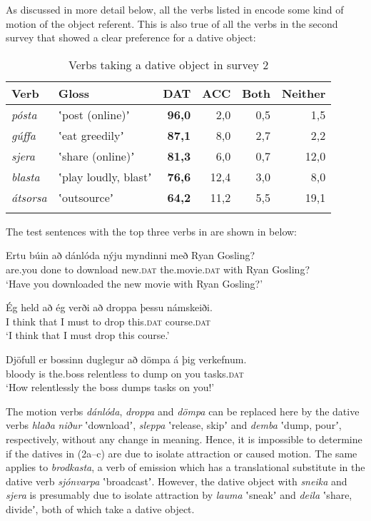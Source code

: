 \documentclass[output=paper,modfonts,nonflat,colorlinks,citecolor=brown]{langsci/langscibook}
\begin{document}
As discussed in more detail below, all the verbs listed in  encode some kind of motion of the object referent. This is also true of all the verbs in the second survey that showed a clear preference for a dative object:

\begin{table}
{\caption{\label{tab:jonsson:2}Verbs taking a dative object in survey 2}}
\begin{tabularx}{\textwidth}{XXrrrr}
\lsptoprule
Verb & Gloss & \textbf{DAT} & ACC & Both & Neither\\
\midrule
\textit{pósta} & ʽpost (online)ʼ & \textbf{96,0} & 2,0 & 0,5 & 1,5\\
\textit{gúffa} & ʽeat greedilyʼ & \textbf{87,1} & 8,0 & 2,7 & 2,2\\
\textit{sjera} & ʽshare (online)ʼ & \textbf{81,3} & 6,0 & 0,7 & 12,0\\
\textit{blasta} & ʽplay loudly, blastʼ & \textbf{76,6} & 12,4 & 3,0 & 8,0\\
\textit{átsorsa} & ʽoutsourceʼ & \textbf{64,2} & 11,2 & 5,5 & 19,1\\
\lspbottomrule
\end{tabularx}
\end{table}

The test sentences with the top three verbs in  are shown in  below:


\ea%
    \label{ex:jonsson:2}

\ea
\gll  Ertu  búin  að  dánlóda  nýju  myndinni  með  Ryan  Gosling?\\
   are.you  done  to  download  new.\textsc{dat}  the.movie.\textsc{dat}  with  Ryan  Gosling?\\
\glt `Have you downloaded the new movie with Ryan Gosling?'


\ex
\gll   Ég  held  að  ég  verði  að  droppa  þessu  námskeiði.\\
 I  think  that  I  must  to  drop  this.\textsc{dat}  course.\textsc{dat}\\
\glt `I think that I must drop this course.'


\ex
\gll   Djöfull  er  bossinn  duglegur  að  dömpa  á  þig  verkefnum.\\
 bloody  is  the.boss  relentless  to  dump  on  you  tasks.\textsc{dat}\\
\glt `How relentlessly the boss dumps tasks on you!'
\z
\z

The motion verbs \textit{dánlóda}, \textit{droppa} and \textit{dömpa} can be replaced here by the dative verbs \textit{hlaða} \textit{niður} ʽdownloadʼ, \textit{sleppa} ʽrelease, skipʼ and \textit{demba} ʽdump, pourʼ, respectively, without any change in meaning.\textstyleFootnoteSymbol{} Hence, it is impossible to determine if the datives in (2a--c) are due to isolate attraction or caused motion. The same applies to \textit{brodkasta}, a verb of emission which has a translational substitute in the dative verb \textit{sjónvarpa} ʽbroadcastʼ. However, the dative object with \textit{sneika} and \textit{sjera} is presumably due to isolate attraction by \textit{lauma} ʽsneakʼ and \textit{deila} ʽshare, divideʼ, both of which take a dative object.
\end{document}
